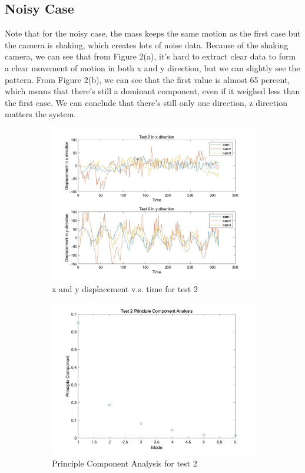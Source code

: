 \documentclass[12pt,letterpaper]{article}
\begin{document}
\subsection*{Noisy Case}
Note that for the noisy case, the mass keeps the same motion as the first case but the camera is shaking, which creates lots of noise data. Because of the shaking camera, we can see that from Figure 2(a), it's hard to extract clear data to form a clear movement of motion in both x and y direction, but we can slightly see the pattern. From Figure 2(b), we can see that the first value is almost 65 percent, which means that there's still a dominant component, even if it weighed less than the first case. We can conclude that there's still only one direction, z direction matters the system. 
\begin{figure}[ht]
\begin{subfigure}{.5\textwidth}
  \centering
  \includegraphics[width=0.9\linewidth]{2-a.jpg}  
  \caption{x and y displacement v.s. time for test 2}
  \label{fig:sub-first}
\end{subfigure}
\begin{subfigure}{.5\textwidth}
  \centering
  \includegraphics[width=0.9\linewidth]{2-b.jpg}  
  \caption{Principle Component Analysis for test 2}
  \label{fig:sub-second}
\end{subfigure}
\label{fig:fig}
\caption{}
\end{figure}
\end{document}
